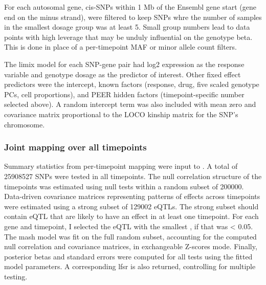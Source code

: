 %
For each autosomal gene, cis-\glspl{SNP} within 1 Mb of the Ensembl gene start (gene end on the minus strand),
were filtered to keep \glspl{SNP} whre the number of samples in the smallest dosage group was at least 5.
Small group numbers lead to data points with high leverage that may be unduly influential on the genotype beta.
This is done in place of a per-timepoint \gls{MAF} or minor allele count filters.

The limix model for each \gls{SNP}-gene pair had 
log2 expression as the response variable
and genotype dosage as the predictor of interest.
Other fixed effect predictors were
the intercept,
known factors (response, drug, five scaled genotype \glspl{PC}, cell proportions), 
and PEER hidden factors (timepoint-specific number selected above).
A random intercept term was also included with mean zero and covariance matrix proportional to the \gls{LOCO} kinship matrix for the \gls{SNP}'s chromosome.

\subsubsection{Joint  mapping over all timepoints}

Summary statistics from per-timepoint mapping were input to  \autocite{urbut2018FlexibleStatisticalMethods}.
A total of \num{25908527} \glspl{SNP} were tested in all timepoints.
The null correlation structure of the timepoints was estimated using null tests within a random subset of \num{200000}.
Data-driven covariance matrices representing patterns of effects across timepoints were estimated using a strong subset of \num{129002} \glspl{eQTL}.
The strong subset should contain \gls{eQTL} that are likely to have an effect in at least one timepoint.
For each gene and timepoint, I selected the \gls{eQTL} with the smallest \pvalue{}, if that \pvalue{} was < 0.05.
The mash model was fit on the full random subset, accounting for the computed null correlation and covariance matrices, in exchangeable Z-scores mode.
Finally, posterior betas and standard errors were computed for all tests using the fitted model parameters.
A corresponding \gls{lfsr} is also returned, controlling for multiple testing.

